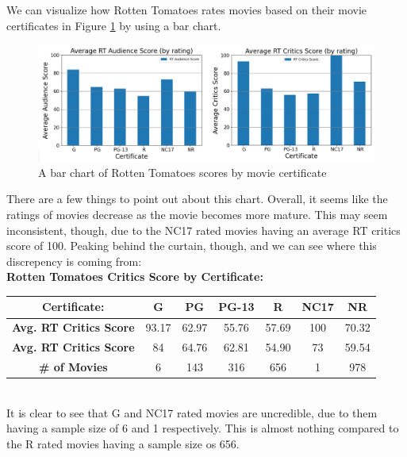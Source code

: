 \documentclass[12pt]{article}
\begin{document}
\noindent We can visualize how Rotten Tomatoes rates movies based on their movie certificates in Figure \ref{Figure 10} by using a bar chart.

\begin{figure}[h]
\begin{center}
      \includegraphics[width=6in]{figure10.png}
      \caption{A bar chart of Rotten Tomatoes scores by movie certificate}
      \label{Figure 10}
\end{center}
\end{figure}

\noindent There are a few things to point out about this chart. Overall, it seems like the ratings of movies decrease as the movie becomes more mature. This may seem inconsistent, though, due to the NC17 rated movies having an average RT critics score of 100. Peaking behind the curtain, though, and we can see where this discrepency is coming from: \\

\noindent \textbf{Rotten Tomatoes Critics Score by Certificate:}
\begin{center}
\begin{tabular}{|c|c|c|c|c|c|c|} 
\hline
\textbf{Certificate:} & \textbf{G} & \textbf{PG} & \textbf{PG-13} & \textbf{R} & \textbf{NC17} & \textbf{NR} \\
\hline
\textbf{Avg. RT Critics Score} & 93.17 & 62.97 & 55.76 & 57.69 & 100 & 70.32 \\
\hline
\textbf{Avg. RT Critics Score} & 84 & 64.76 & 62.81 & 54.90 & 73 & 59.54 \\
\hline
\textbf{\# of Movies} & 6 & 143 & 316 & 656 & 1 & 978 \\
\hline
\end{tabular}
\end{center}

\quad \\

\noindent It is clear to see that G and NC17 rated movies are uncredible, due to them having a sample size of 6 and 1 respectively. This is almost nothing compared to the R rated movies having a sample size os 656.
\end{document}

